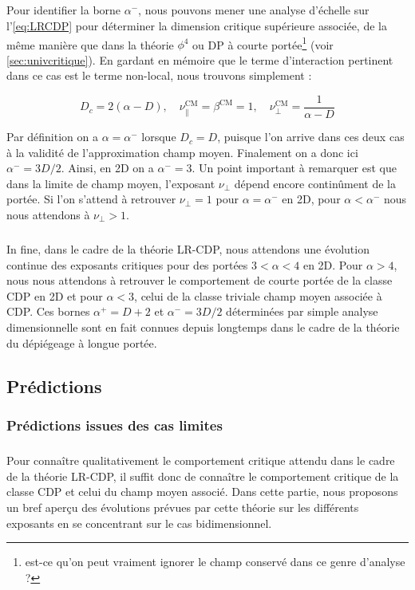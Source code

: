 \subparagraph{}Pour identifier la borne $\alpha^-$, nous pouvons mener une analyse d'échelle sur l'\autoref{eq:LRCDP} pour déterminer la dimension critique supérieure associée, de la même manière que dans la théorie $\phi^4$ ou DP à courte portée\footnote{est-ce qu'on peut vraiment ignorer le champ conservé dans ce genre d'analyse ?} (voir \autoref{sec:univcritique}). En gardant en mémoire que le terme d'interaction pertinent dans ce cas est le terme non-local, nous trouvons simplement :

\begin{equation}
	D_c = 2(\alpha-D),\quad \nu_\parallel^\text{CM}= \beta^\text{CM}= 1, \quad \nu_\perp^\text{CM}=\frac{1}{\alpha-D}
\end{equation}

\noindent Par définition on a $\alpha = \alpha^-$ lorsque $D_c=D$, puisque l'on arrive dans ces deux cas à la validité de l'approximation champ moyen. Finalement on a donc ici $\alpha^- = 3D/2$. Ainsi, en 2D on a $\alpha^-=3$. Un point important à remarquer est que dans la limite de champ moyen, l'exposant $\nu_\perp$ dépend encore continûment de la portée. Si l'on s'attend à retrouver $\nu_\perp = 1$ pour $\alpha=\alpha^-$ en 2D, pour $\alpha < \alpha^-$ nous nous attendons à $\nu_\perp > 1$.

\subparagraph{}In fine, dans le cadre de la théorie LR-CDP, nous attendons une évolution continue des exposants critiques pour des portées $3<\alpha<4$ en 2D. Pour $\alpha>4$, nous nous attendons à retrouver le comportement de courte portée de la classe CDP en 2D et pour $\alpha<3$, celui de la classe triviale champ moyen associée à CDP. Ces bornes $\alpha^+ = D+2$ et $\alpha^-=3D/2$ déterminées par simple analyse dimensionnelle sont en fait connues depuis longtemps dans le cadre de la théorie du dépiégeage à longue portée.

\subsection{Prédictions}

\subsubsection{Prédictions issues des cas limites}

\subparagraph{}Pour connaître qualitativement le comportement critique attendu dans le cadre de la théorie LR-CDP, il suffit donc de connaître le comportement critique de la classe CDP et celui du champ moyen associé. Dans cette partie, nous proposons un bref aperçu des évolutions prévues par cette théorie sur les différents exposants en se concentrant sur le cas bidimensionnel.

